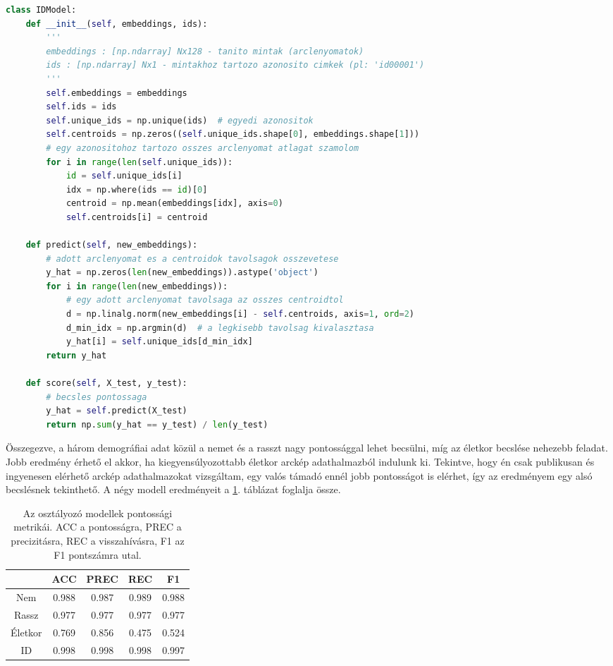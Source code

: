 \begin{lstlisting}[language=python, caption={Az identifikációs modell működése. Az megadott tanító minták és címkék alapján képes eldönteni egy ismeretlen arclenyomatról, hogy az melyik személyhez tartozik.}, label=lst:idmodel]
class IDModel:
	def __init__(self, embeddings, ids):
		'''
		embeddings : [np.ndarray] Nx128 - tanito mintak (arclenyomatok)
		ids : [np.ndarray] Nx1 - mintakhoz tartozo azonosito cimkek (pl: 'id00001')
		'''
		self.embeddings = embeddings
		self.ids = ids
		self.unique_ids = np.unique(ids)  # egyedi azonositok
		self.centroids = np.zeros((self.unique_ids.shape[0], embeddings.shape[1]))
		# egy azonositohoz tartozo osszes arclenyomat atlagat szamolom
		for i in range(len(self.unique_ids)):
			id = self.unique_ids[i]
			idx = np.where(ids == id)[0]
			centroid = np.mean(embeddings[idx], axis=0)
			self.centroids[i] = centroid

	def predict(self, new_embeddings):
		# adott arclenyomat es a centroidok tavolsagok osszevetese
		y_hat = np.zeros(len(new_embeddings)).astype('object')
		for i in range(len(new_embeddings)):
			# egy adott arclenyomat tavolsaga az osszes centroidtol
			d = np.linalg.norm(new_embeddings[i] - self.centroids, axis=1, ord=2)
			d_min_idx = np.argmin(d)  # a legkisebb tavolsag kivalasztasa
			y_hat[i] = self.unique_ids[d_min_idx]
		return y_hat

	def score(self, X_test, y_test):
		# becsles pontossaga
		y_hat = self.predict(X_test)
		return np.sum(y_hat == y_test) / len(y_test)
\end{lstlisting}

Összegezve, a három demográfiai adat közül a nemet és a rasszt nagy pontossággal lehet becsülni, míg az életkor becslése nehezebb feladat. Jobb eredmény érhető el akkor, ha kiegyensúlyozottabb életkor arckép adathalmazból indulunk ki. Tekintve, hogy én csak publikusan és ingyenesen elérhető arckép adathalmazokat vizsgáltam, egy valós támadó ennél jobb pontosságot is elérhet, így az eredményem egy alsó becslésnek tekinthető. A négy modell eredményeit a \ref{tab:pontossagok}. táblázat foglalja össze.

\begin{table}[ht]
	\centering
	\begin{tabular}{|c|c|c|c|c|}
		\hline
		& ACC & PREC & REC & F1 \\
		\hline
		\hline
		Nem & 0.988 & 0.987 & 0.989 & 0.988 \\
		\hline
		Rassz & 0.977 & 0.977 & 0.977 & 0.977 \\
		\hline
		Életkor & 0.769 & 0.856 & 0.475 & 0.524 \\
		\hline
		ID & 0.998 & 0.998 & 0.998 & 0.997 \\
		\hline
	\end{tabular}
	\caption{Az osztályozó modellek pontossági metrikái. ACC a pontosságra, PREC a precizitásra, REC a visszahívásra, F1 az F1 pontszámra utal.}
	\label{tab:pontossagok}
\end{table}
 
